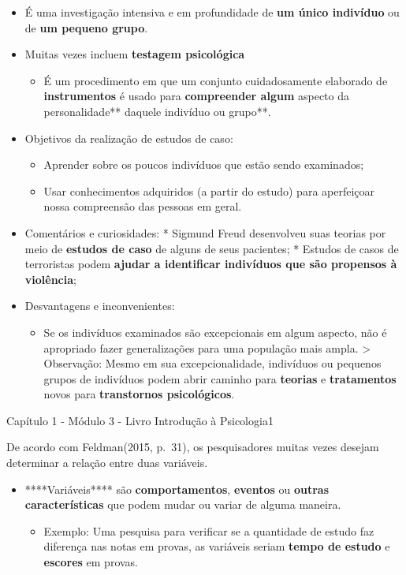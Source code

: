 \documentclass[
]{book}
\providecommand{\tightlist}{%
  \setlength{\itemsep}{0pt}\setlength{\parskip}{0pt}}
\begin{document}
\begin{itemize}
\tightlist
\item
  É uma investigação intensiva e em profundidade de \textbf{um único indivíduo} ou de \textbf{um pequeno grupo}.
\item
  Muitas vezes incluem \textbf{testagem psicológica}

  \begin{itemize}
  \tightlist
  \item
    É um procedimento em que um conjunto cuidadosamente elaborado de \textbf{instrumentos} é usado para \textbf{compreender algum }aspecto da personalidade** daquele indivíduo ou grupo**.
  \end{itemize}
\item
  Objetivos da realização de estudos de caso:

  \begin{itemize}
  \tightlist
  \item
    Aprender sobre os poucos indivíduos que estão sendo examinados;
  \item
    Usar conhecimentos adquiridos (a partir do estudo) para aperfeiçoar nossa compreensão das pessoas em geral.
  \end{itemize}
\item
  Comentários e curiosidades:
  * Sigmund Freud desenvolveu suas teorias por meio de \textbf{estudos de caso} de alguns de seus pacientes;
  * Estudos de casos de terroristas podem \textbf{ajudar a identificar indivíduos que são propensos à violência};
\item
  Desvantagens e inconvenientes:

  \begin{itemize}
  \tightlist
  \item
    Se os indivíduos examinados são excepcionais em algum aspecto, não é apropriado fazer generalizações para uma população mais ampla.
    \textgreater{} Observação: Mesmo em sua excepcionalidade, indivíduos ou pequenos grupos de indivíduos podem abrir caminho para \textbf{teorias} e \textbf{tratamentos} novos para \textbf{transtornos psicológicos}.
  \end{itemize}
\end{itemize}

Capítulo 1 - Módulo 3 - Livro Introdução à Psicologia1

De acordo com Feldman(2015, p.~31), os pesquisadores muitas vezes desejam determinar a relação entre duas variáveis.

\begin{itemize}
\tightlist
\item
  ****Variáveis**** são \textbf{comportamentos}, \textbf{eventos} ou \textbf{outras características} que podem mudar ou variar de alguma maneira.

  \begin{itemize}
  \tightlist
  \item
    Exemplo: Uma pesquisa para verificar se a quantidade de estudo faz diferença nas notas em provas, as
    variáveis seriam \textbf{tempo de estudo} e \textbf{escores} em provas.
  \end{itemize}
\end{itemize}
\end{document}
